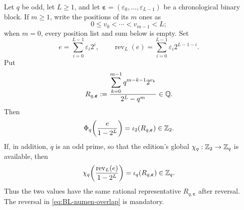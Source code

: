 \begin{theorem}
\label{thm:BL-numen-periodic-overlap}
Let $q$ be odd, let $L\geq1$, and let
$\boldsymbol\varepsilon=(\varepsilon_0,\ldots,\varepsilon_{L-1})$ be a
chronological binary block.  If $m\geq1$, write the positions of its $m$ ones
as
\[
 0\leq v_0<\cdots<v_{m-1}<L;
\]
when $m=0$, every position list and sum below is empty.  Set
\begin{equation}
\label{eq:chronological-and-reversed-codes}
 e=\sum_{i=0}^{L-1}\varepsilon_i2^i,
 \qquad
 \operatorname{rev}_L(e)
   =\sum_{i=0}^{L-1}\varepsilon_i2^{L-1-i}.
\end{equation}
Put
\begin{equation}
\label{eq:BL-periodic-rational}
 R_{q,\boldsymbol\varepsilon}
 :=\frac{\displaystyle
         \sum_{k=0}^{m-1}q^{m-k-1}2^{v_k}}
        {2^L-q^m}\in\mathbb Q.
\end{equation}
Then
\[
 \Phi_q\!\left(\frac{e}{1-2^L}\right)
 =\iota_2\!\left(R_{q,\boldsymbol\varepsilon}\right)\in\mathbb Z_2.
\]
If, in addition, $q$ is an odd prime, so that the edition's global
$\chi_q:\mathbb Z_2\to\mathbb Z_q$ is available, then
\begin{equation}
\label{eq:BL-numen-overlap}
 \chi_q\!\left(
       \frac{\operatorname{rev}_L(e)}{1-2^L}\right)
 =\iota_q\!\left(R_{q,\boldsymbol\varepsilon}\right)\in\mathbb Z_q.
\end{equation}
Thus the two values have the same rational representative
$R_{q,\boldsymbol\varepsilon}$ after reversal.  The reversal in
\cref{eq:BL-numen-overlap} is mandatory.
\end{theorem}

